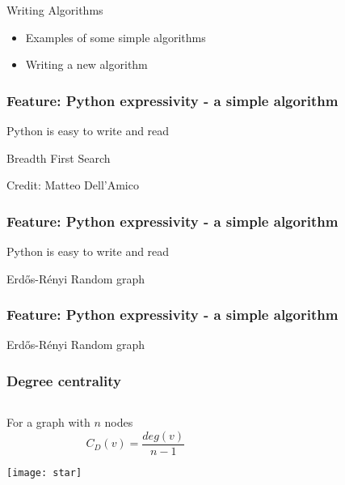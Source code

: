 \begin{frame}
\frametitle{}
\begin{center}
{\fontsize{49}{90}\selectfont
{\color{title} Writing Algorithms}}
\end{center}
\begin{itemize}
\item Examples of some simple algorithms
\item Writing a new algorithm
\end{itemize}
\end{frame}

\begin{frame}[fragile]
\frametitle{Feature: Python expressivity - a simple algorithm}
Python is easy to write and read
\begin{block}{Breadth First Search}

\end{block}
Credit: Matteo Dell'Amico
\end{frame}



\begin{frame}[fragile]
\frametitle{Feature: Python expressivity - a simple algorithm}
Python is easy to write and read
\begin{block}{Erd\H{o}s-R\'enyi Random graph}

\end{block}
\end{frame}

\begin{frame}[fragile]
\frametitle{Feature: Python expressivity - a simple algorithm}
\begin{block}{Erd\H{o}s-R\'enyi Random graph}
\small

\end{block}
\end{frame}



\begin{frame}
\frametitle{Degree centrality}
\begin{columns}
\begin{column}{0.5\textwidth}
For a graph with $n$ nodes
\begin{equation*}
C_D(v) = \frac{deg(v)}{n-1}
\end{equation*}
\centerline{\texttt{[image: star]}}
\end{column}
\begin{column}{0.5\textwidth}



\end{column}
\end{columns}
\end{frame}



